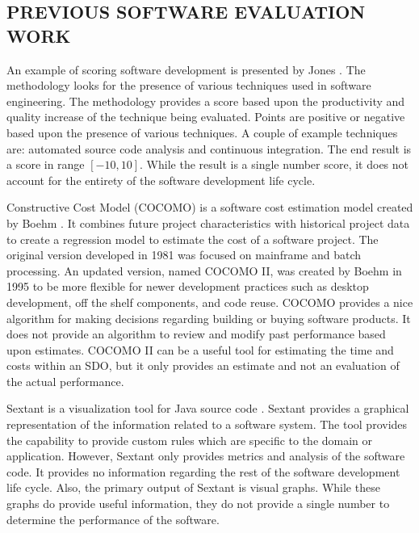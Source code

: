\documentclass[SDSUThesis.tex]{subfiles}
\begin{document}
\subsection{PREVIOUS SOFTWARE EVALUATION WORK}

    An example of scoring software development is presented by 
    Jones \cite{Jones2012}. The methodology looks
    for the presence of various techniques used in software engineering.  
    The methodology provides a score based upon the 
    productivity and quality increase of the technique being evaluated.  
    Points are positive or negative based upon the 
    presence of various techniques. A couple of example techniques are: 
    automated source code analysis and continuous integration.  The end 
    result is a score in range $[-10,10]$. 
    While the result is a single number score, it does not account for the 
    entirety of the software development life cycle.

    Constructive Cost Model (COCOMO) is a software cost estimation model created
    by Boehm \cite{Boehm1981}.  It combines future project characteristics
    with historical project data to create a regression model to estimate the 
    cost of a software project.  The original version developed in 1981 was
    focused on mainframe and batch processing.  An updated version, named
    COCOMO II, was created by Boehm in 1995 to be more flexible for newer 
    development practices such as desktop development, off the shelf components,
    and code reuse.  COCOMO provides a nice algorithm for making decisions
    regarding building or buying software products.  It does not provide 
    an algorithm to review and modify past performance 
    based upon estimates.  COCOMO II can be a useful tool for 
    estimating the time and costs within an SDO,
    but it only provides an estimate and not an evaluation of the actual
    performance. 
    
    Sextant is a visualization tool for Java source code \cite{Winter2013}.  
    Sextant provides a graphical representation of the information related 
    to a software system.  The tool provides the capability to provide 
    custom rules which are specific to the domain or application.  However,
    Sextant only provides metrics and analysis of the software code.  
    It provides no information regarding the rest of the 
    software development life cycle.  Also, the primary output of Sextant 
    is visual graphs.  While these graphs do provide
    useful information, they do not provide a single number 
    to determine the performance of the software.
\end{document}
